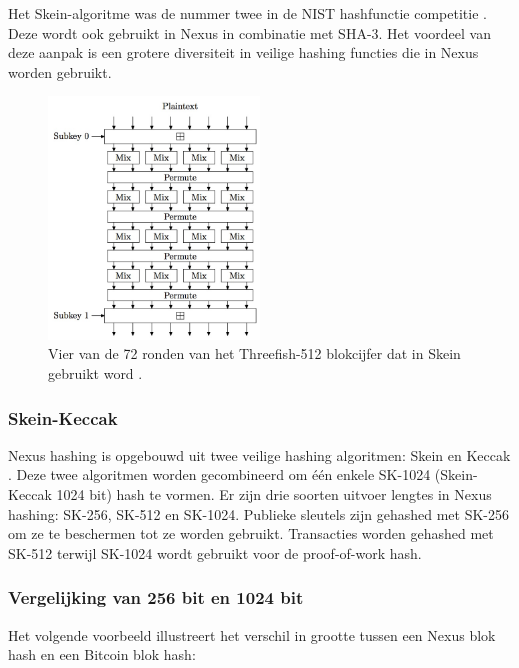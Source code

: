 \documentclass[11pt]{article}
\begin{document}
Het Skein-algoritme was de nummer twee in de NIST hashfunctie competitie \cite{wikiskein}.
Deze wordt ook gebruikt in Nexus in combinatie met SHA-3. Het voordeel van deze aanpak is een grotere diversiteit in veilige hashing functies die in Nexus worden gebruikt.

\begin{figure} %
    \caption{Vier van de 72 ronden van het Threefish-512 blokcijfer dat in Skein gebruikt word \cite{skeinpaper}.}
    \centering
    \includegraphics[width=0.50\textwidth]{skein-threefish-512-part.jpg}
\end{figure}

\pagebreak
\subsubsection{Skein-Keccak}

Nexus hashing is opgebouwd uit twee veilige hashing algoritmen: Skein en Keccak \cite{sha3announce}. 
Deze twee algoritmen worden gecombineerd om \'e\'en enkele SK-1024 (Skein-Keccak 1024 bit) hash te vormen. 
Er zijn drie soorten uitvoer lengtes in Nexus hashing: SK-256, SK-512 en SK-1024. Publieke sleutels zijn gehashed met SK-256 om ze te beschermen tot ze worden gebruikt. 
Transacties worden gehashed met SK-512 terwijl SK-1024 wordt gebruikt voor de proof-of-work hash.

\subsubsection{Vergelijking van 256 bit en 1024 bit}

Het volgende voorbeeld illustreert het verschil in grootte tussen een Nexus blok hash en een Bitcoin blok hash:
\end{document}
